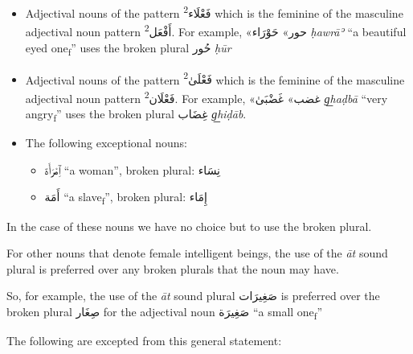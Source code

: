 \documentclass[
  10pt,
]{book}
\providecommand{\tightlist}{%
  \setlength{\itemsep}{0pt}\setlength{\parskip}{0pt}}
\begin{document}
\begin{itemize}
\item
  Adjectival nouns of the pattern \foreignlanguage{arabic}{فَعْلَاء\textsuperscript{2}} which is the feminine of the masculine adjectival noun pattern \foreignlanguage{arabic}{أَفْعَل\textsuperscript{2}}. For example, \foreignlanguage{arabic}{«حور»} \foreignlanguage{arabic}{حَوْرَاء} \emph{ḥawrāʾ} \enquote{a beautiful eyed one\textsubscript{f}} uses the broken plural \foreignlanguage{arabic}{حُور} \emph{ḥūr}
\item
  Adjectival nouns of the pattern \foreignlanguage{arabic}{فَعْلَىٰ\textsuperscript{2}} which is the feminine of the masculine adjectival noun pattern \foreignlanguage{arabic}{فَعْلَان\textsuperscript{2}}. For example, \foreignlanguage{arabic}{«غضب»} \foreignlanguage{arabic}{غَضْبَىٰ} \emph{g͟haḍbā} \enquote{very angry\textsubscript{f}} uses the broken plural \foreignlanguage{arabic}{غِضَاب} \emph{g͟hiḍāb}.
\item
  The following exceptional nouns:

  \begin{itemize}
  \tightlist
  \item
    \foreignlanguage{arabic}{ٱِمْرَأَة} \enquote{a woman}, broken plural: \foreignlanguage{arabic}{نِسَاء}
  \item
    \foreignlanguage{arabic}{أَمَة} \enquote{a slave\textsubscript{f}}, broken plural: \foreignlanguage{arabic}{إِمَاء}
  \end{itemize}
\end{itemize}

In the case of these nouns we have no choice but to use the broken plural.

For other nouns that denote female intelligent beings, the use of the \emph{āt} sound plural is preferred over any broken plurals that the noun may have.

So, for example,
the use of the \emph{āt} sound plural
\foreignlanguage{arabic}{صَغِيرَات}
is preferred over the broken plural
\foreignlanguage{arabic}{صِغَار}
for the adjectival noun
\foreignlanguage{arabic}{صَغِيرَة}
\enquote{a small one\textsubscript{f}}

The following are excepted from this general statement:
\end{document}
